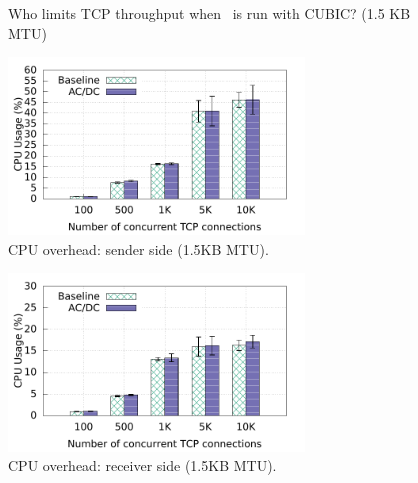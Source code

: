 \begin{figure}[!t]
        \caption{Who limits TCP throughput when~\acdc{} is run with CUBIC? (1.5 KB MTU)}
        \label{who_limits_compare_cwnd_rwnd}
\end{figure}

\begin{figure}[!t]
        \centering
  \includegraphics[width=0.7\textwidth]{acdctcp/figures/overhead/sender_15k_compare_cpu_witherrbar.pdf}
        \caption{CPU overhead: sender side (1.5KB MTU).}
        \label{cpu_overhead_sender_15k}
\end{figure}

\begin{figure}[!t]
        \centering
  \includegraphics[width=0.7\textwidth]{acdctcp/figures/overhead/receiver_15k_compare_cpu_witherrbar.pdf}
        \caption{CPU overhead: receiver side (1.5KB MTU).}
        \label{cpu_overhead_receiver_15k}
\end{figure}


